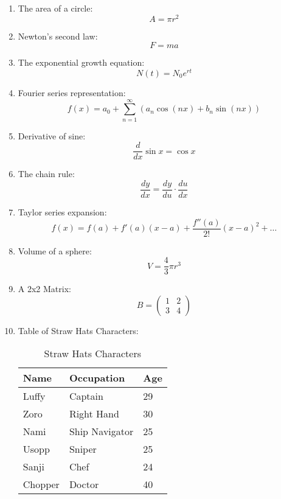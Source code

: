 \documentclass{article}
\begin{document}
\begin{enumerate}
    \item The area of a circle:
    \[
    A = \pi r^2
    \]
    
    \item Newton's second law:
    \[
    F = ma
    \]
    
    \item The exponential growth equation:
    \[
    N(t) = N_0 e^{rt}
    \]
    
    \item Fourier series representation:
    \[
    f(x) = a_0 + \sum_{n=1}^{\infty} \left( a_n \cos(nx) + b_n \sin(nx) \right)
    \]
    
    \item Derivative of sine:
    \[
    \frac{d}{dx}\sin x = \cos x
    \]
    
    \item The chain rule:
    \[
    \frac{dy}{dx} = \frac{dy}{du} \cdot \frac{du}{dx}
    \]
    
    \item Taylor series expansion:
    \[
    f(x) = f(a) + f'(a)(x - a) + \frac{f''(a)}{2!}(x - a)^2 + \dots
    \]
    
    \item Volume of a sphere:
    \[
    V = \frac{4}{3} \pi r^3
    \]
    
    \item A 2x2 Matrix:
    \[
    B = \begin{pmatrix}
    1 & 2 \\
    3 & 4
    \end{pmatrix}
    \]
    
    \item Table of Straw Hats Characters:
    \begin{table}[h]
        \centering
        \caption{Straw Hats Characters}
        \begin{tabular}{@{}lll@{}}
            \toprule
            \textbf{Name} & \textbf{Occupation}      & \textbf{Age} \\ \midrule
            Luffy         & Captain                  & 29           \\
            Zoro          & Right Hand               & 30           \\
            Nami          & Ship Navigator           & 25           \\
            Usopp         & Sniper                   & 25           \\
            Sanji         & Chef                     & 24           \\ 
            Chopper       & Doctor                   & 40           \\ \bottomrule
        \end{tabular}
    \end{table}
\end{enumerate}
\end{document}

